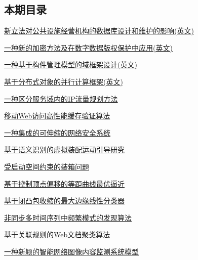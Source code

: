 \documentclass[a4paper]{article}
\begin{document}
\subsection{本期目录}
\href{http://www.jos.org.cn/ch/reader/download_pdf.aspx?file_no=20020301&year_id=2002&quarter_id=3&falg=1}{新立法对公共设施经营机构的数据库设计和维护的影响(英文)}

\href{http://www.jos.org.cn/ch/reader/download_pdf.aspx?file_no=20020302&year_id=2002&quarter_id=3&falg=1}{一种新的加密方法及在数字数据版权保护中应用(英文)}

\href{http://www.jos.org.cn/ch/reader/download_pdf.aspx?file_no=20020303&year_id=2002&quarter_id=3&falg=1}{一种基于构件管理模型的域框架设计(英文)}

\href{http://www.jos.org.cn/ch/reader/download_pdf.aspx?file_no=20020304&year_id=2002&quarter_id=3&falg=1}{基于分布式对象的并行计算框架(英文)}

\href{http://www.jos.org.cn/ch/reader/download_pdf.aspx?file_no=20020306&year_id=2002&quarter_id=3&falg=1}{一种区分服务域内的IP流量规划方法}

\href{http://www.jos.org.cn/ch/reader/download_pdf.aspx?file_no=20020307&year_id=2002&quarter_id=3&falg=1}{移动Web访问高性能缓存验证算法}

\href{http://www.jos.org.cn/ch/reader/download_pdf.aspx?file_no=20020308&year_id=2002&quarter_id=3&falg=1}{一种集成的可伸缩的网络安全系统}

\href{http://www.jos.org.cn/ch/reader/download_pdf.aspx?file_no=20020309&year_id=2002&quarter_id=3&falg=1}{基于语义识别的虚拟装配运动引导研究}

\href{http://www.jos.org.cn/ch/reader/download_pdf.aspx?file_no=20020310&year_id=2002&quarter_id=3&falg=1}{受启动空间约束的装箱问题}

\href{http://www.jos.org.cn/ch/reader/download_pdf.aspx?file_no=20020311&year_id=2002&quarter_id=3&falg=1}{基于控制顶点偏移的等距曲线最优逼近}

\href{http://www.jos.org.cn/ch/reader/download_pdf.aspx?file_no=20020312&year_id=2002&quarter_id=3&falg=1}{基于闭凸包收缩的最大边缘线性分类器}

\href{http://www.jos.org.cn/ch/reader/download_pdf.aspx?file_no=20020313&year_id=2002&quarter_id=3&falg=1}{非同步多时间序列中频繁模式的发现算法}

\href{http://www.jos.org.cn/ch/reader/download_pdf.aspx?file_no=20020314&year_id=2002&quarter_id=3&falg=1}{基于关联规则的Web文档聚类算法}

\href{http://www.jos.org.cn/ch/reader/download_pdf.aspx?file_no=20020315&year_id=2002&quarter_id=3&falg=1}{一种新颖的智能网络图像内容监测系统模型}
\end{document}
